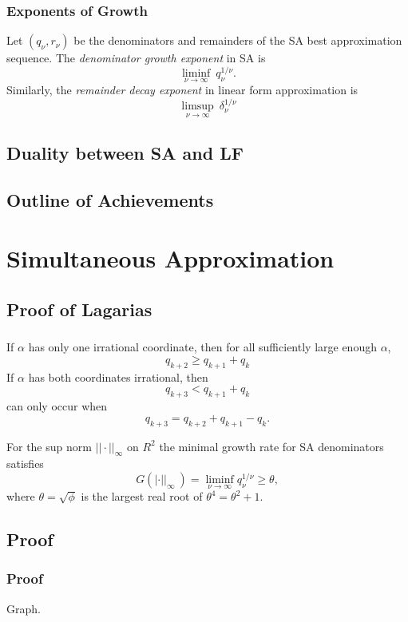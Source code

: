 \documentclass[aspectratio=1610]{beamer}
\begin{document}
\begin{frame}
  \frametitle{Exponents of Growth}
Let $(q_\nu, r_\nu)$ be the denominators and remainders of the SA best approximation sequence.  
The \emph{denominator growth exponent} in SA is
\[
\liminf_{\nu \to \infty} \ q_\nu ^{1/\nu}.
\]
Similarly, the \emph{remainder decay exponent} in linear form approximation is
\[
\limsup_{\nu \to \infty} \ \delta_\nu ^{1/\nu}
\]

\end{frame}

\subsection{Duality between SA and LF}
\subsection{Outline of Achievements}

\section{Simultaneous Approximation}

\subsection {Proof of Lagarias}
\begin{frame}
  \frametitle{}
\begin{theorem}
If \(\alpha\) has only one irrational coordinate, then for all sufficiently large enough \(\alpha\), \[q_{k+2}\geq q_{k+1}+q_k\]
If \(\alpha\) has both coordinates irrational, then \[q_{k+3}<q_{k+1}+q_k\]
can only occur when
\[q_{k+3}=q_{k+2}+q_{k+1}-q_{k}.\]
\end{theorem}
  \begin{corollary}
  For the sup norm \(||\cdot ||_\infty\) on \(R^2\) the minimal growth rate for SA denominators satisfies
      \begin{equation}
    G(|\cdot ||_\infty\ ) = \liminf_{\nu\to\infty} q_{\nu}^{1/\nu}\geq \theta,
\end{equation}
where \(\theta = \sqrt{\phi}\) is the largest real root of
\(\theta^4=\theta^2+1.\)
  \end{corollary}
\end{frame}

\subsection {Proof}
\begin{frame}
  \frametitle{Proof}
Graph.
\end{frame}
\end{document}
